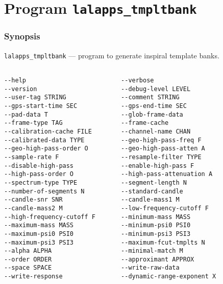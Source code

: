 \section{Program \texttt{lalapps\_tmpltbank}}
\label{program:lalapps-tmpltbank}

\subsubsection{Synopsis}
\noindent \verb$lalapps_tmpltbank$ --- program to generate inspiral template banks.
\begin{verbatim}

--help                          --verbose                   
--version                       --debug-level LEVEL      
--user-tag STRING               --comment STRING       
--gps-start-time SEC            --gps-end-time SEC  
--pad-data T                    --glob-frame-data         
--frame-type TAG                --frame-cache          
--calibration-cache FILE        --channel-name CHAN          
--calibrated-data TYPE          --geo-high-pass-freq F   
--geo-high-pass-order O         --geo-high-pass-atten A  
--sample-rate F                 --resample-filter TYPE      	
--disable-high-pass             --enable-high-pass F         
--high-pass-order O             --high-pass-attenuation A   
--spectrum-type TYPE            --segment-length N      
--number-of-segments N          --standard-candle           
--candle-snr SNR                --candle-mass1 M             
--candle-mass2 M                --low-frequency-cutoff F     
--high-frequency-cutoff F       --minimum-mass MASS        
--maximum-mass MASS             --minimum-psi0 PSI0          
--maximum-psi0 PSI0             --minimum-psi3 PSI3          
--maximum-psi3 PSI3             --maximum-fcut-tmplts N    
--alpha ALPHA                   --minimal-match M       
--order ORDER                   --approximant APPROX          
--space SPACE                   --write-raw-data           
--write-response                --dynamic-range-exponent X  

\end{verbatim}

